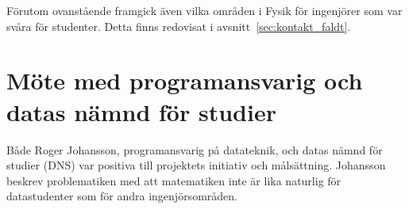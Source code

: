 Förutom ovanstående framgick även vilka områden i Fysik för ingenjörer som var
svåra för studenter. Detta finns redovisat i avsnitt~\ref{sec:kontakt_faldt}.

\section{Möte med programansvarig och datas nämnd för studier}

Både Roger Johansson, programansvarig på datateknik, och datas nämnd för studier (DNS)
var positiva till projektets initiativ och målsättning. Johansson beskrev
problematiken med att matematiken inte är lika naturlig för datastudenter som för
andra ingenjörsområden.
